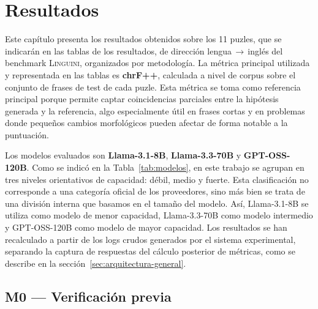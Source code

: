 \chapter{Resultados}
\label{cap:resultados}

Este capítulo presenta los resultados obtenidos sobre los 11 puzles, que se indicarán en las tablas de los resultados, de dirección lengua\,$\rightarrow$\,inglés del benchmark \textsc{Linguini}, organizados por metodología. La métrica principal utilizada y representada en las tablas es \textbf{chrF++}, calculada a nivel de corpus sobre el conjunto de frases de test de cada puzle. Esta métrica se toma como referencia principal porque permite captar coincidencias parciales entre la hipótesis generada y la referencia, algo especialmente útil en frases cortas y en problemas donde pequeños cambios morfológicos pueden afectar de forma notable a la puntuación.

Los modelos evaluados son \textbf{Llama-3.1-8B}, \textbf{Llama-3.3-70B} y \textbf{GPT-OSS-120B}. Como se indicó en la Tabla~\ref{tab:modelos}, en este trabajo se agrupan en tres niveles orientativos de capacidad: débil, medio y fuerte. Esta clasificación no corresponde a una categoría oficial de los proveedores, sino más bien se trata de una división interna que basamos en el tamaño del modelo. Así, Llama-3.1-8B se utiliza como modelo de menor capacidad, Llama-3.3-70B como modelo intermedio y GPT-OSS-120B como modelo de mayor capacidad. Los resultados se han recalculado a partir de los logs crudos generados por el sistema experimental, separando la captura de respuestas del cálculo posterior de métricas, como se describe en la sección~\ref{sec:arquitectura-general}.

\section{M0 — Verificación previa}
\label{sec:resultados_m0}

